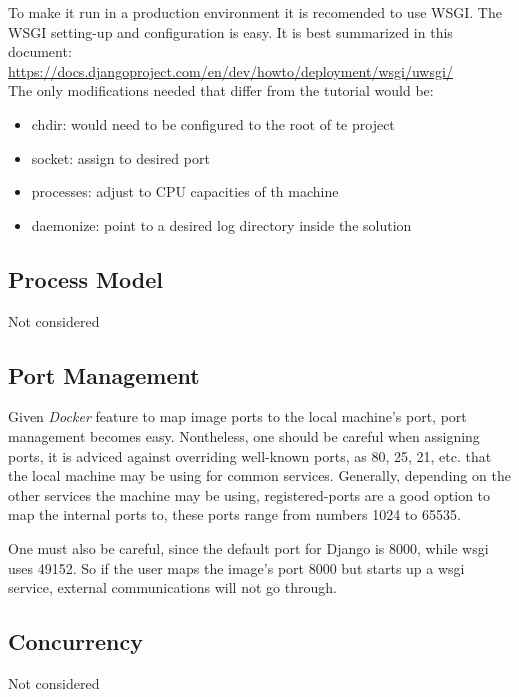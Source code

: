 \documentclass[10pt]{article}
\begin{document}
To make it run in a production environment it is recomended to use WSGI. The WSGI setting-up and configuration is easy. It is best summarized in this document:\\ \href{https://docs.djangoproject.com/en/dev/howto/deployment/wsgi/uwsgi/}{https://docs.djangoproject.com/en/dev/howto/deployment/wsgi/uwsgi/}\\

The only modifications needed that differ from the tutorial would be:

\begin{itemize}
	\item chdir: would need to be configured to the root of te project
	\item socket: assign to desired port
	\item processes: adjust to CPU capacities of th machine
	\item daemonize: point to a desired log directory inside the solution
\end{itemize}
 
 \subsection{Process Model}
 
 Not considered
 
 \subsection{Port Management}
 
Given \textit{Docker} feature to map image ports to the local machine's port, port management becomes easy. Nontheless, one should be careful when assigning ports, it is adviced against overriding well-known ports, as 80, 25, 21, etc. that the local machine may be using for common services. Generally, depending on the other services the machine may be using, registered-ports are a good option to map the internal ports to, these ports range from numbers 1024 to 65535. 

One must also be careful, since the default port for Django is 8000, while wsgi uses 49152. So if the user maps the image's port 8000 but starts up a wsgi service, external communications will not go through.
 
 \subsection{Concurrency}
 
 Not considered
 
\end{document}
